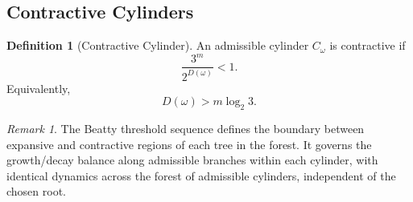 \documentclass[12pt, oneside]{article}
\numberwithin{equation}{section}
\theoremstyle{definition}
\newtheorem{definition}{Definition}[section]
\theoremstyle{plain}
\theoremstyle{remark}
\newtheorem*{remark}{Remark}
\begin{document}
\subsection{Contractive Cylinders}

\begin{definition}[Contractive Cylinder]
An admissible cylinder $C_\omega$ is contractive if
\[
\frac{3^m}{2^{D(\omega)}}<1.
\]
Equivalently,
\[
D(\omega)>m\log_2 3.
\]
\end{definition}

\begin{remark}
The Beatty threshold sequence  defines the boundary between
expansive and contractive regions of each tree in the forest. It governs
the growth/decay balance along admissible branches within each cylinder,
with identical dynamics across the forest of admissible cylinders, independent
of the chosen root.
\end{remark}







\end{document}
